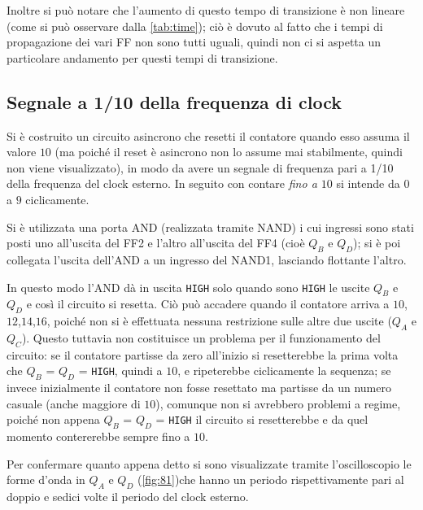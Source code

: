 \documentclass[a4paper,10pt]{article}
\def\code#1{\texttt{#1}}
\begin{document}
Inoltre si può notare che l'aumento di questo tempo di transizione è non lineare (come si può osservare dalla \cref{tab:time}); ciò è dovuto al fatto che i tempi di propagazione dei vari FF non sono tutti uguali, quindi non ci si aspetta un particolare andamento per questi tempi di transizione. 


\subsection{Segnale a 1/10 della frequenza di clock}
Si è costruito un circuito asincrono che resetti il contatore quando esso assuma il valore $10$ (ma poiché il reset è asincrono non lo assume mai stabilmente, quindi non viene visualizzato), in modo da avere un segnale di frequenza pari a 1/10 della frequenza del clock esterno. In seguito con contare \textit{fino a $10$} si intende da $0$ a $9$ ciclicamente.

Si è utilizzata una porta AND (realizzata tramite NAND) i cui ingressi sono stati posti uno all'uscita del FF2 e l'altro all'uscita del FF4 (cioè $Q_B$ e $Q_D$); si è poi collegata l'uscita dell'AND a un ingresso del NAND1, lasciando flottante l'altro.

In questo modo l'AND dà in uscita \code{HIGH} solo quando sono \code{HIGH} le uscite $Q_B$ e $Q_D$ e così il circuito si resetta.
Ciò può accadere quando il contatore arriva a $10$,$12$,$14$,$16$, poiché non si è effettuata nessuna restrizione sulle altre due uscite ($Q_A$ e $Q_C$). Questo tuttavia non costituisce un problema per il funzionamento del circuito: se il contatore partisse da zero all'inizio si resetterebbe la prima volta che $Q_B$ = $Q_D$ = \code{HIGH}, quindi a $10$, e ripeterebbe ciclicamente la sequenza; se invece inizialmente il contatore non fosse resettato ma partisse da un numero casuale (anche maggiore di $10$), comunque non si avrebbero problemi a regime, poiché non appena $Q_B$ = $Q_D$ = \code{HIGH} il circuito si resetterebbe e da quel momento contererebbe sempre fino a $10$.

Per confermare quanto appena detto si sono visualizzate tramite l'oscilloscopio le forme d'onda in $Q_A$ e $Q_D$ (\cref{fig:81})che hanno un periodo rispettivamente pari al doppio e sedici volte il periodo del clock esterno.
\end{document}
